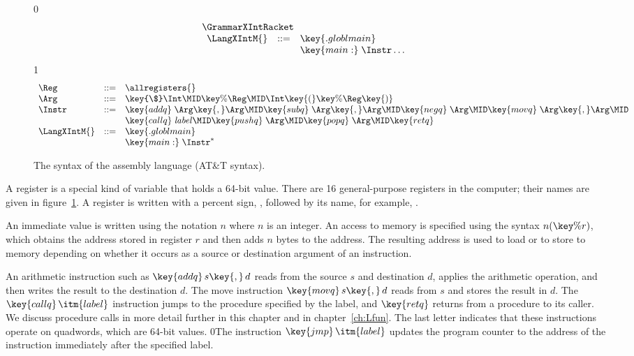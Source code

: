 \documentclass[7x10]{TimesAPriori_MIT}%
\def\racketEd{0}
\def\pythonEd{1}
\def\edition{1}
\newcommand{\racket}[1]{{\if\edition\racketEd{#1}\fi}}
\newcommand{\pythonColor}[0]{}
\numberwithin{theorem}{chapter}
\numberwithin{definition}{chapter}
\numberwithin{equation}{chapter}
\begin{document}
\begin{figure}[tp]
\begin{tcolorbox}[colback=white]
{\if\edition\racketEd    
\[
\begin{array}{l}
  \GrammarXIntRacket \\
\begin{array}{lcl}
\LangXIntM{} &::= & \key{.globl main}\\
      &    & \key{main:} \; \Instr\ldots
\end{array}
\end{array}
\]
\fi}
{\if\edition\pythonEd\pythonColor
\[
\begin{array}{lcl}
\Reg &::=& \allregisters{} \\
\Arg &::=&  \key{\$}\Int \MID \key{\%}\Reg \MID \Int\key{(}\key{\%}\Reg\key{)}\\
\Instr &::=& \key{addq} \; \Arg\key{,} \Arg \MID
      \key{subq} \; \Arg\key{,} \Arg \MID
      \key{negq} \; \Arg \MID \key{movq} \; \Arg\key{,} \Arg \MID \\
  &&  \key{callq} \; \mathit{label} \MID
      \key{pushq}\;\Arg \MID \key{popq}\;\Arg \MID \key{retq} \\
\LangXIntM{} &::= & \key{.globl main}\\
      &    & \key{main:} \; \Instr^{*}
\end{array}
\]
\fi}
\end{tcolorbox}
\caption{The syntax of the \LangXInt{} assembly language (AT\&T syntax).}
\label{fig:x86-int-concrete}
\end{figure}

A register is a special kind of variable that holds a 64-bit
value. There are 16 general-purpose registers in the computer; their
names are given in figure~\ref{fig:x86-int-concrete}.  A register is
written with a percent sign, \key{\%}, followed by its name,
for example, .

An immediate value is written using the notation \key{\$}$n$ where $n$
is an integer.
%
%
An access to memory is specified using the syntax $n(\key{\%}r)$,
which obtains the address stored in register $r$ and then adds $n$
bytes to the address. The resulting address is used to load or to store
to memory depending on whether it occurs as a source or destination
argument of an instruction.

An arithmetic instruction such as $\key{addq}\,s\key{,}\,d$ reads from
the source $s$ and destination $d$, applies the arithmetic operation,
and then writes the result to the destination $d$. 
%
The move instruction $\key{movq}\,s\key{,}\,d$ reads from $s$ and
stores the result in $d$.
%
The $\key{callq}\,\itm{label}$ instruction jumps to the procedure
specified by the label, and $\key{retq}$ returns from a procedure to
its caller. 
%
We discuss procedure calls in more detail further in this chapter and
in chapter~\ref{ch:Lfun}.
%
The last letter  indicates that these instructions operate on
quadwords, which are 64-bit values.
%
\racket{The instruction $\key{jmp}\,\itm{label}$ updates the program
  counter to the address of the instruction immediately after the
  specified label.}
\end{document}
